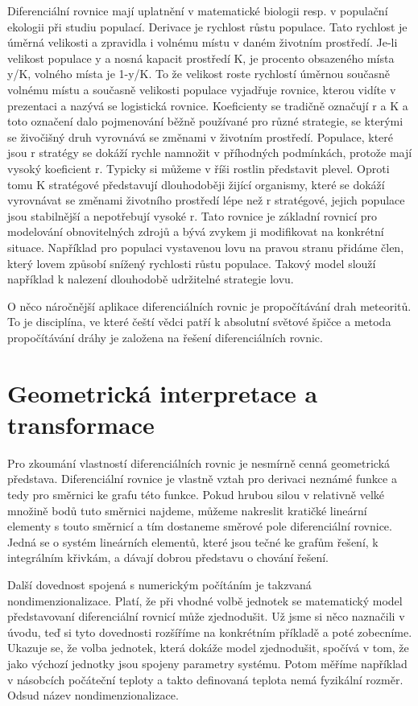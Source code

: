 Diferenciální rovnice mají uplatnění v matematické biologii resp. v populační ekologii při studiu populací. Derivace je rychlost růstu populace. Tato rychlost je úměrná velikosti a zpravidla i volnému místu v daném životním prostředí. Je-li velikost populace y a nosná kapacit prostředí K, je procento obsazeného místa y/K, volného místa je 1-y/K. To že velikost roste rychlostí úměrnou současně volnému místu a současně velikosti  populace vyjadřuje rovnice, kterou vidíte v prezentaci a nazývá se logistická rovnice. Koeficienty se tradičně označují r a K a toto označení dalo pojmenování běžně používané pro různé strategie, se kterými se živočišný druh vyrovnává se změnami v životním prostředí. Populace, které jsou r stratégy se dokáží rychle namnožit v příhodných podmínkách, protože mají vysoký koeficient r. Typicky si můžeme v říši rostlin představit plevel. Oproti tomu K stratégové představují dlouhodoběji žijící organismy, které se dokáží vyrovnávat se změnami životního prostředí lépe než r stratégové, jejich populace jsou stabilnější a nepotřebují vysoké r. Tato rovnice je základní rovnicí pro modelování obnovitelných zdrojů a bývá zvykem ji modifikovat na konkrétní situace. Například pro populaci vystavenou lovu na pravou stranu přidáme člen, který lovem způsobí snížený rychlosti růstu populace. Takový model slouží například k nalezení dlouhodobě udržitelné strategie lovu.

O něco náročnější aplikace diferenciálních rovnic je propočítávání drah meteoritů. To je disciplína, ve které čeští vědci patří k absolutní světové špičce a metoda propočítávání dráhy je založena na řešení diferenciálních rovnic.


\section*{Geometrická interpretace a transformace}

Pro zkoumání vlastností diferenciálních rovnic je nesmírně cenná geometrická představa. Diferenciální rovnice je vlastně vztah pro derivaci neznámé funkce a tedy pro směrnici ke grafu této funkce. Pokud hrubou silou v relativně velké množině bodů tuto směrnici najdeme, můžeme nakreslit kratičké lineární elementy s touto směrnicí a tím dostaneme směrové pole diferenciální rovnice. Jedná se o systém lineárních elementů, které jsou tečné ke grafům řešení, k integrálním křivkám, a dávají dobrou představu o chování řešení.

Další dovednost spojená s numerickým počítáním je takzvaná nondimenzionalizace. Platí, že při vhodné volbě jednotek se matematický model představovaní diferenciální rovnicí může zjednodušit. Už jsme si něco naznačili v úvodu, teď si tyto dovednosti rozšíříme na konkrétním příkladě a poté zobecníme. Ukazuje se, že volba jednotek, která dokáže model zjednodušit, spočívá v tom, že jako výchozí jednotky jsou spojeny parametry systému. Potom měříme například v násobcích počáteční teploty a takto definovaná teplota nemá fyzikální rozměr. Odsud název nondimenzionalizace.

